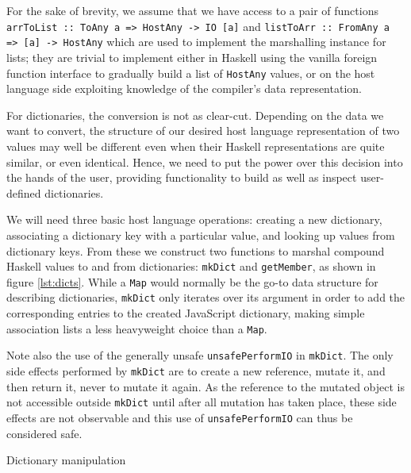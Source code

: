 \documentclass[preprint]{sigplanconf}
\begin{document}
For the sake of brevity, we assume that we have
access to a pair of functions
\lstinline!arrToList :: ToAny a => HostAny -> IO [a]!
and \lstinline!listToArr :: FromAny a => [a] -> HostAny!
which are used to implement the marshalling instance for lists;
they are trivial to implement either in Haskell using the vanilla foreign
function interface to gradually build a list of \lstinline!HostAny! values,
or on the host language side exploiting knowledge of the compiler's
data representation.

For dictionaries, the conversion is not as clear-cut. Depending on the data
we want to convert, the structure of our desired host language representation
of two values may well be different even when their Haskell
representations are quite similar, or even identical.
Hence, we need to put the power over this decision into the hands of the user,
providing functionality to build as well as inspect user-defined dictionaries.

We will need three basic host language operations: creating a new dictionary,
associating a dictionary key with a particular value, and looking up values
from dictionary keys. From these we construct two functions to marshal compound
Haskell values to and from dictionaries: \lstinline!mkDict!
and \lstinline!getMember!, as shown in figure \ref{lst:dicts}.
While a \lstinline!Map! would normally be the go-to data structure for
describing dictionaries, \lstinline!mkDict! only iterates over its argument
in order to add the corresponding entries to the created JavaScript dictionary,
making simple association lists a less heavyweight choice than a
\lstinline!Map!.

Note also the use of the generally unsafe \lstinline!unsafePerformIO!
in \lstinline!mkDict!. The only side effects performed by
\lstinline!mkDict! are to create a new reference, mutate it, and then
return it, never to mutate it again. As the reference to the mutated object
is not accessible outside \lstinline!mkDict! until after all mutation has
taken place, these side effects are not observable and this use of
\lstinline!unsafePerformIO! can thus be considered safe.

\begin{listingfloat}
\caption{Dictionary manipulation}
\label{lst:dicts}
\end{listingfloat}
\end{document}
